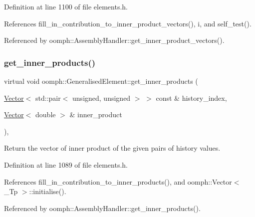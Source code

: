 Definition at line 1100 of file elements.\+h.



References fill\+\_\+in\+\_\+contribution\+\_\+to\+\_\+inner\+\_\+product\+\_\+vectors(), i, and self\+\_\+test().



Referenced by oomph\+::\+Assembly\+Handler\+::get\+\_\+inner\+\_\+product\+\_\+vectors().

\mbox{\label{classoomph_1_1GeneralisedElement_a50091d9dad94bd60d5b6fa6c6e9a6fbc}} 
\subsubsection{\texorpdfstring{get\+\_\+inner\+\_\+products()}{get\_inner\_products()}}
{\footnotesize\ttfamily virtual void oomph\+::\+Generalised\+Element\+::get\+\_\+inner\+\_\+products (\begin{DoxyParamCaption}\item[{\hyperlink{classoomph_1_1Vector}{Vector}$<$ std\+::pair$<$ unsigned, unsigned $>$ $>$ const \&}]{history\+\_\+index,  }\item[{\hyperlink{classoomph_1_1Vector}{Vector}$<$ double $>$ \&}]{inner\+\_\+product }\end{DoxyParamCaption})\hspace{0.3cm}{\ttfamily [inline]}, {\ttfamily [virtual]}}



Return the vector of inner product of the given pairs of history values. 



Definition at line 1089 of file elements.\+h.



References fill\+\_\+in\+\_\+contribution\+\_\+to\+\_\+inner\+\_\+products(), and oomph\+::\+Vector$<$ \+\_\+\+Tp $>$\+::initialise().



Referenced by oomph\+::\+Assembly\+Handler\+::get\+\_\+inner\+\_\+products().

\mbox{\label{classoomph_1_1GeneralisedElement_ab915bdad7e6643e5e73a6d98bc7cf48e}} 
